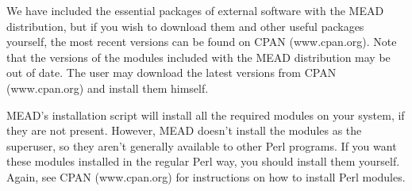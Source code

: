 \documentclass[10pt]{article}
\begin{document}
We have included the essential packages of external software with the
MEAD distribution, but if you wish to download them and other useful
packages yourself, the most recent versions can be found on CPAN
(www.cpan.org).
Note that the versions of the modules included with the MEAD
distribution may be out of date.  The user may download the
latest versions from CPAN (www.cpan.org) and install them himself.

MEAD's installation script will install all the required modules
on your system, if they are not present.  However, MEAD doesn't
install the modules as the superuser, so they aren't generally
available to other Perl programs.  If you want these
modules installed in the regular Perl way, you should install
them yourself.  Again, see CPAN (www.cpan.org) for instructions
on how to install Perl modules.
\end{document}
